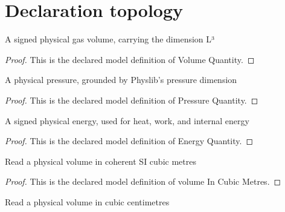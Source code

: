 \section{Declaration topology}
\begin{definition}
  \label{def:physics:phyx-mini-0410:phyxminiproblems-problemphyxmini0410-volumequantity}
  A signed physical gas volume, carrying the dimension L³
\end{definition}
\begin{proof}
  This is the declared model definition of Volume Quantity.
\end{proof}
\begin{definition}
  \label{def:physics:phyx-mini-0410:phyxminiproblems-problemphyxmini0410-pressurequantity}
  A physical pressure, grounded by Physlib's pressure dimension
\end{definition}
\begin{proof}
  This is the declared model definition of Pressure Quantity.
\end{proof}
\begin{definition}
  \label{def:physics:phyx-mini-0410:phyxminiproblems-problemphyxmini0410-energyquantity}
  A signed physical energy, used for heat, work, and internal energy
\end{definition}
\begin{proof}
  This is the declared model definition of Energy Quantity.
\end{proof}
\begin{definition}
  \label{def:physics:phyx-mini-0410:phyxminiproblems-problemphyxmini0410-volumeincubicmetres}
  Read a physical volume in coherent SI cubic metres
\end{definition}
\begin{proof}
  This is the declared model definition of volume In Cubic Metres.
\end{proof}
\begin{definition}
  \label{def:physics:phyx-mini-0410:phyxminiproblems-problemphyxmini0410-volumeincubiccentimetres}
  Read a physical volume in cubic centimetres
\end{definition}
